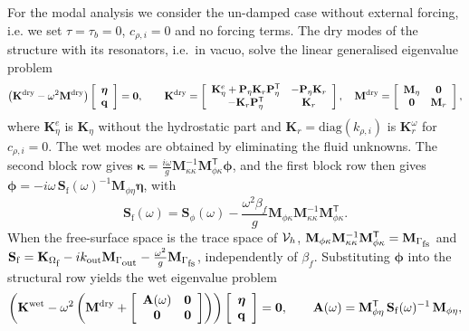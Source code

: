 For the modal analysis we consider the un-damped case without external forcing, i.e. we set $\tau=\tau_b=0$, $c_{\rho,i}=0$ and no forcing terms. The dry modes of the structure with its resonators, i.e.\ in vacuo, solve the linear generalised eigenvalue problem
\begin{equation}\label{eq:eigDry}
    \left(\mathbf{K}^{\mathrm{dry}}-\omega^2\mathbf{M}^{\mathrm{dry}}\right)
    \left[\begin{array}{c}\boldsymbol{\eta}\\ \mathbf{q}\end{array}\right]=\mathbf{0},
    \qquad
    \mathbf{K}^{\mathrm{dry}}=
    \left[\begin{array}{cc}
        \mathbf{K}_\eta^{e}+\mathbf{P}_\eta\mathbf{K}_r\mathbf{P}_\eta^{\mathsf T} & -\mathbf{P}_\eta\mathbf{K}_r\\
        -\mathbf{K}_r\mathbf{P}_\eta^{\mathsf T} & \mathbf{K}_r
    \end{array}\right],
    \quad
    \mathbf{M}^{\mathrm{dry}}=
    \left[\begin{array}{cc}\mathbf{M}_\eta & \mathbf{0}\\ \mathbf{0} & \mathbf{M}_r\end{array}\right],
\end{equation}
where $\mathbf{K}_\eta^e$ is $\mathbf{K}_\eta$ without the hydrostatic part and $\mathbf{K}_r=\mathrm{diag}(k_{\rho,i})$ is $\mathbf{K}_r^\omega$ for $c_{\rho,i}=0$. The wet modes are obtained by eliminating the fluid unknowns. The second block row gives $\boldsymbol{\kappa}=\frac{i\omega}{g}\mathbf{M}_{\kappa\kappa}^{-1}\mathbf{M}_{\phi\kappa}^{\mathsf T}\boldsymbol{\phi}$, and the first block row then gives $\boldsymbol{\phi}=-i\omega\,\mathbf{S}_{\mathrm{f}}(\omega)^{-1}\mathbf{M}_{\phi\eta}\boldsymbol{\eta}$, with
\begin{equation}\label{eq:fluid_schur}
    \mathbf{S}_{\mathrm{f}}(\omega)=\mathbf{S}_\phi(\omega)-\frac{\omega^2\beta_f}{g}\mathbf{M}_{\phi\kappa}\mathbf{M}_{\kappa\kappa}^{-1}\mathbf{M}_{\phi\kappa}^{\mathsf T}.
\end{equation}
When the free-surface space is the trace space of $\mathcal{V}_h$, $\mathbf{M}_{\phi\kappa}\mathbf{M}_{\kappa\kappa}^{-1}\mathbf{M}_{\phi\kappa}^{\mathsf T}=\mathbf{M}_{\Gamma_{\mbox{\scriptsize fs}}}$ and $\mathbf{S}_{\mathrm{f}}=\mathbf{K}_{\Omega_{\mbox{\scriptsize f}}}-ik_{\mathrm{out}}\mathbf{M}_{\Gamma_{\mbox{\scriptsize out}}}-\frac{\omega^2}{g}\mathbf{M}_{\Gamma_{\mbox{\scriptsize fs}}}$, independently of $\beta_f$. Substituting $\boldsymbol{\phi}$ into the structural row yields the wet eigenvalue problem
\begin{equation}\label{eq:eigWet}
    \left(\mathbf{K}^{\mathrm{wet}}-\omega^2\left(\mathbf{M}^{\mathrm{dry}}+\left[\begin{array}{cc}\mathbf{A}(\omega) & \mathbf{0}\\ \mathbf{0} & \mathbf{0}\end{array}\right]\right)\right)
    \left[\begin{array}{c}\boldsymbol{\eta}\\ \mathbf{q}\end{array}\right]=\mathbf{0},
    \qquad
    \mathbf{A}(\omega)=\mathbf{M}_{\phi\eta}^{\mathsf T}\,\mathbf{S}_{\mathrm{f}}(\omega)^{-1}\,\mathbf{M}_{\phi\eta},
\end{equation}
